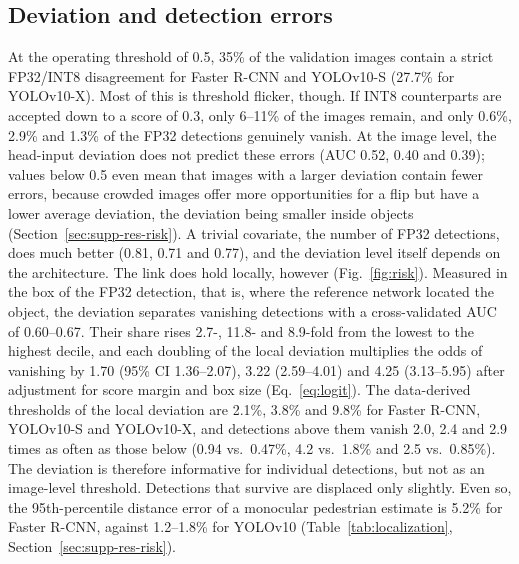 \documentclass[pdflatex,sn-mathphys-num]{sn-jnl}%
\theoremstyle{thmstyleone}%
\theoremstyle{thmstyletwo}%
\theoremstyle{thmstylethree}%
\begin{document}
\subsection{Deviation and detection errors}\label{sec:res-risk}
At the operating threshold of 0.5, 35\% of the validation images contain a strict FP32/INT8 disagreement for Faster R-CNN and YOLOv10-S (27.7\% for YOLOv10-X). Most of this is threshold flicker, though. If INT8 counterparts are accepted down to a score of 0.3, only 6--11\% of the images remain, and only 0.6\%, 2.9\% and 1.3\% of the FP32 detections genuinely vanish. At the image level, the head-input deviation does not predict these errors (AUC 0.52, 0.40 and 0.39); values below 0.5 even mean that images with a larger deviation contain fewer errors, because crowded images offer more opportunities for a flip but have a lower average deviation, the deviation being smaller inside objects (Section~\ref{sec:supp-res-risk}). A trivial covariate, the number of FP32 detections, does much better (0.81, 0.71 and 0.77), and the deviation level itself depends on the architecture. The link does hold locally, however (Fig.~\ref{fig:risk}). Measured in the box of the FP32 detection, that is, where the reference network located the object, the deviation separates vanishing detections with a cross-validated AUC of 0.60--0.67. Their share rises 2.7-, 11.8- and 8.9-fold from the lowest to the highest decile, and each doubling of the local deviation multiplies the odds of vanishing by 1.70 (95\% CI 1.36--2.07), 3.22 (2.59--4.01) and 4.25 (3.13--5.95) after adjustment for score margin and box size (Eq.~\eqref{eq:logit}). The data-derived thresholds of the local deviation are 2.1\%, 3.8\% and 9.8\% for Faster R-CNN, YOLOv10-S and YOLOv10-X, and detections above them vanish 2.0, 2.4 and 2.9 times as often as those below (0.94 vs.\ 0.47\%, 4.2 vs.\ 1.8\% and 2.5 vs.\ 0.85\%). The deviation is therefore informative for individual detections, but not as an image-level threshold. Detections that survive are displaced only slightly. Even so, the 95th-percentile distance error of a monocular pedestrian estimate is 5.2\% for Faster R-CNN, against 1.2--1.8\% for YOLOv10 (Table~\ref{tab:localization}, Section~\ref{sec:supp-res-risk}).
\end{document}
